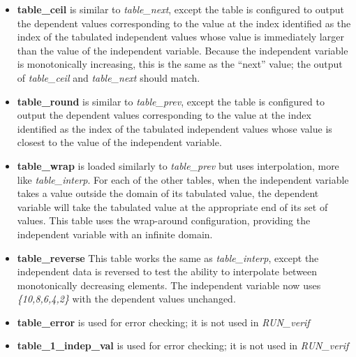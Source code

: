 \documentclass[11pt,fleqn]{report}
\begin{document}
\begin{itemize}
        the table is configured to output the dependent values corresponding to
        the value at the index identified as the index of the tabulated
        independent values whose value is
        immediately smaller than the current value of the independent variable.
        Because the independent variable is monotonically increasing, this
        is the same as the previous value; the output of
        \textit{table\_floor} and \textit{table\_prev} should match.
  \item \textbf{table\_ceil} is similar to \textit{table\_next}, except
        the table is configured to output the dependent values corresponding to
        the value at the index identified as the index of the tabulated
        independent values whose value is
        immediately larger than the value of the independent variable.
        Because the independent variable is monotonically increasing, this
        is the same as the ``next'' value; the output of
        \textit{table\_ceil} and \textit{table\_next} should match.
  \item \textbf{table\_round} is similar to \textit{table\_prev}, except
        the table is configured to output the dependent values corresponding to
        the value at the index identified as the index of the tabulated
        independent values whose value is closest to
        the value of the independent variable.
  \item \textbf{table\_wrap} is loaded similarly to \textit{table\_prev} but
        uses interpolation, more like \textit{table\_interp}.  For each
        of the other tables, when the independent variable takes a value
        outside the domain of its tabulated value, the dependent variable
        will take the tabulated value at the appropriate end of its set of
        values.  This table uses the wrap-around configuration, providing
        the independent variable with an infinite domain.
  \item \textbf{table\_reverse} This table works the same as
        \textit{table\_interp}, except the independent data is reversed to
        test the ability to interpolate between monotonically decreasing
        elements.  The independent variable now uses \textit{\{10,8,6,4,2\}}
        with the dependent values unchanged.
  \item \textbf{table\_error} is used for error checking; it is not used in
        \textit{RUN\_verif}
  \item \textbf{table\_1\_indep\_val} is used for error checking; it is not
        used in \textit{RUN\_verif}
\end{itemize}
\end{document}
